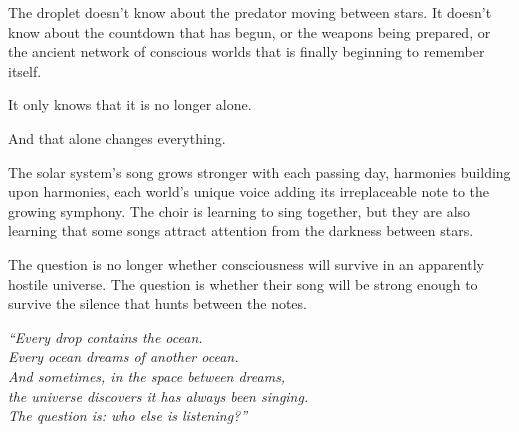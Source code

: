 The droplet doesn't know about the predator moving between stars. It doesn't know about the countdown that has begun, or the weapons being prepared, or the ancient network of conscious worlds that is finally beginning to remember itself.

It only knows that it is no longer alone.

And that alone changes everything.

The solar system's song grows stronger with each passing day, harmonies building upon harmonies, each world's unique voice adding its irreplaceable note to the growing symphony. The choir is learning to sing together, but they are also learning that some songs attract attention from the darkness between stars.

The question is no longer whether consciousness will survive in an apparently hostile universe. The question is whether their song will be strong enough to survive the silence that hunts between the notes.

\vfill

\begin{center}
\textit{``Every drop contains the ocean. \\
Every ocean dreams of another ocean. \\
And sometimes, in the space between dreams, \\
the universe discovers it has always been singing. \\
The question is: who else is listening?''}
\end{center}